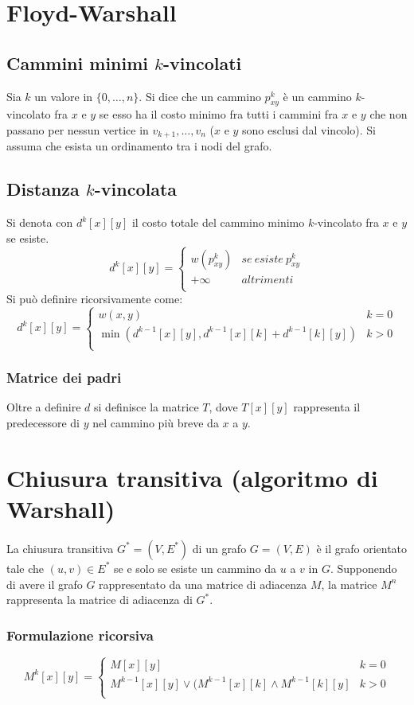\section{Floyd-Warshall}
\subsection{Cammini minimi $k$-vincolati}
Sia $k$ un valore in $\{0, \dots, n\}$. Si dice che un cammino $p^k_{xy}$ \`e un cammino $k$-vincolato fra $x$ e $y$ se esso ha il costo minimo fra tutti i cammini fra $x$ e $y$ che non 
passano per nessun vertice in $v_{k+1}, \dots, v_n$ ($x$ e $y$ sono esclusi dal vincolo). Si assuma che esista un ordinamento tra i nodi del grafo.
\subsection{Distanza $k$-vincolata}
Si denota con $d^k[x][y]$ il costo totale del cammino minimo $k$-vincolato fra $x$ e $y$ se esiste.
$$ d^k[x][y] = \begin{cases}
	w(p^k_{xy}) & se\ esiste\ p^k_{xy}\\
	+\infty & altrimenti\\
\end{cases}$$
Si pu\`o definire ricorsivamente come:
$$ d^k[x][y] = \begin{cases}
	w(x, y) & k = 0\\
	\min(d^{k-1}[x][y], d^{k-1}[x][k]+d^{k-1}[k][y]) & k>0\\
\end{cases}$$
\subsubsection{Matrice dei padri}
Oltre a definire $d$ si definisce la matrice $T$, dove $T[x][y]$ rappresenta il predecessore di $y$ nel cammino pi\`u breve da $x$ a $y$.\\

\section{Chiusura transitiva (algoritmo di Warshall)}
La chiusura transitiva $G^* = (V, E^*)$ di un grafo $G = (V, E)$ \`e il grafo orientato tale che $(u, v)\in E^*$ se e solo se esiste un cammino da $u$ a $v$ in $G$. Supponendo di avere il
grafo $G$ rappresentato da una matrice di adiacenza $M$, la matrice $M^n$ rappresenta la matrice di adiacenza di $G^*$.
\subsubsection{Formulazione ricorsiva}
$$M^k[x][y] = \begin{cases}
	M[x][y] & k = 0\\
	M^{k-1}[x][y]\lor (M^{k-1}[x][k]\land M^{k-1}[k][y] & k>0\\
\end{cases}$$
